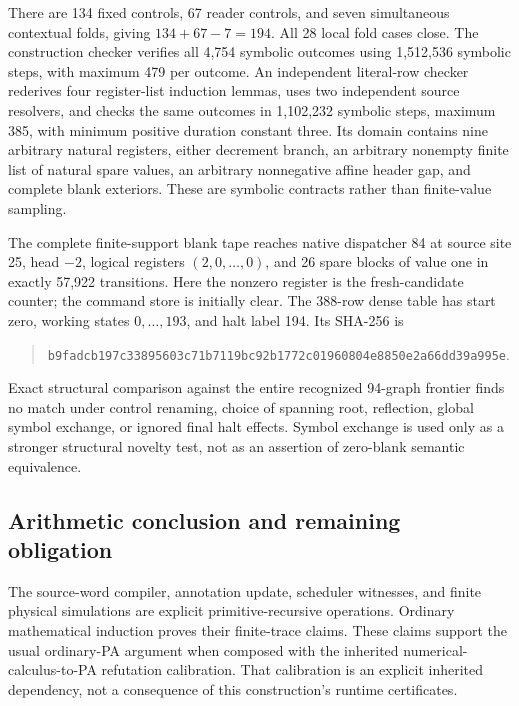 There are 134 fixed controls, 67 reader controls, and seven simultaneous
contextual folds, giving $134+67-7=194$. All 28 local fold cases close.
The construction checker verifies all 4,754 symbolic outcomes using
1,512,536 symbolic steps, with maximum 479 per outcome. An independent
literal-row checker rederives four register-list induction lemmas, uses two
independent source resolvers, and checks the same outcomes in 1,102,232
symbolic steps, maximum 385, with minimum positive duration constant three.
Its domain contains nine arbitrary natural registers, either decrement
branch, an arbitrary nonempty finite list of natural spare values, an
arbitrary nonnegative affine header gap, and complete blank exteriors.
These are symbolic contracts rather than finite-value sampling.

The complete finite-support blank tape reaches native dispatcher 84 at
source site 25, head $-2$, logical registers $(2,0,\ldots,0)$, and 26 spare
blocks of value one in exactly 57,922 transitions. Here the nonzero register
is the fresh-candidate counter; the command store is initially clear.
The 388-row dense table has start zero, working states $0,\ldots,193$,
and halt label 194. Its SHA-256 is
\begin{quote}\small
\nolinkurl{b9fadcb197c33895603c71b7119bc92b1772c01960804e8850e2a66dd39a995e}.
\end{quote}

Exact structural comparison against the entire recognized 94-graph frontier
finds no match under control renaming, choice of spanning root, reflection,
global symbol exchange, or ignored final halt effects. Symbol exchange is
used only as a stronger structural novelty test, not as an assertion of
zero-blank semantic equivalence.

\subsection{Arithmetic conclusion and remaining obligation}

The source-word compiler, annotation update, scheduler witnesses, and
finite physical simulations are explicit primitive-recursive operations.
Ordinary mathematical induction proves their finite-trace claims. These
claims support the usual ordinary-PA argument when composed with the
inherited numerical-calculus-to-PA refutation calibration. That calibration
is an explicit inherited dependency, not a consequence of this construction's
runtime certificates.

